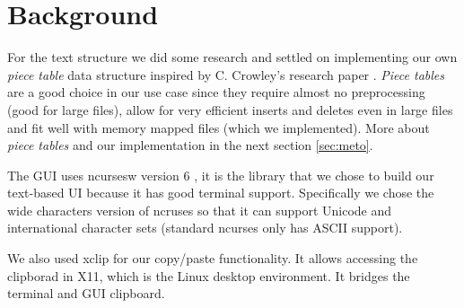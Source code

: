\section{Background}\label{sec:bg}

For the text structure we did some research and settled on implementing our own \textit{piece table} data structure inspired by C. Crowley's research paper \cite{crowley1998data}. \textit{Piece tables} are a good choice in our use case since they require almost no preprocessing (good for large files), allow for very efficient inserts and deletes even in large files and fit well with memory mapped files (which we implemented). More about \textit{piece tables} and our implementation in the next section \ref{sec:meto}. 
\par
\smallskip
The GUI uses ncursesw version 6 \cite{ncursesw}, it is the library that we chose to build our text-based UI because it has good terminal support. Specifically we chose the wide characters version of ncruses so that it can support Unicode and international character sets (standard ncurses only has ASCII support).
\par
\smallskip
We also used xclip \cite{xclip} for our copy/paste functionality. It allows accessing the clipborad in X11, which is the Linux desktop environment. It bridges the terminal and GUI clipboard.